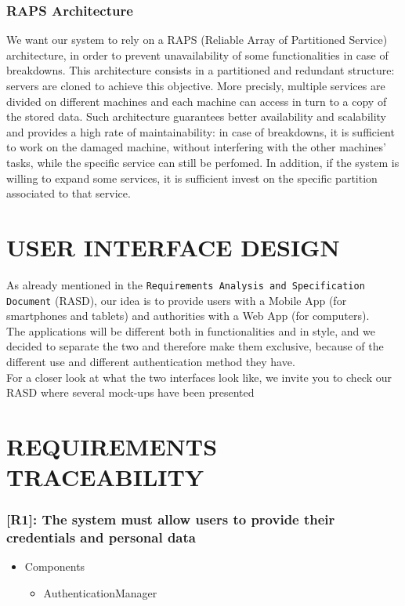 \documentclass[12pt,a4paper]{article}
\begin{document}
\subsubsection{RAPS Architecture}
We want our system to rely on a RAPS (Reliable Array of Partitioned Service) architecture, in order to prevent unavailability of some functionalities in case of breakdowns. This architecture consists in a partitioned and redundant structure: servers are cloned to achieve this objective. More precisly, multiple services are divided on different machines and each machine can access in turn to a copy of the stored data. Such architecture guarantees better availability and scalability and provides a high rate of maintainability: in case of breakdowns, it is sufficient to work on the damaged machine, without interfering with the other machines' tasks, while the specific service can still be perfomed. In addition, if the system is willing to expand some services, it is sufficient invest
on the specific partition associated to that service.
\section{USER INTERFACE DESIGN}
As already mentioned in the \texttt{Requirements Analysis and Specification Document} (RASD), our idea is to provide users with a Mobile App (for smartphones and tablets) and authorities with a Web App (for computers).\\ The applications will be different both in functionalities and in style, and we decided to separate the two and therefore make them exclusive, because of the different use and different authentication method they have.\\ For a closer look at what the two interfaces look like, we invite you to check our RASD where several mock-ups have been presented
\section{REQUIREMENTS TRACEABILITY}
\subsubsection*{[R1]: The system must allow users to provide their credentials and personal data}
\begin{itemize}
\item Components
\begin{itemize}
\item AuthenticationManager
\end{itemize}
\end{itemize}
\end{document}
